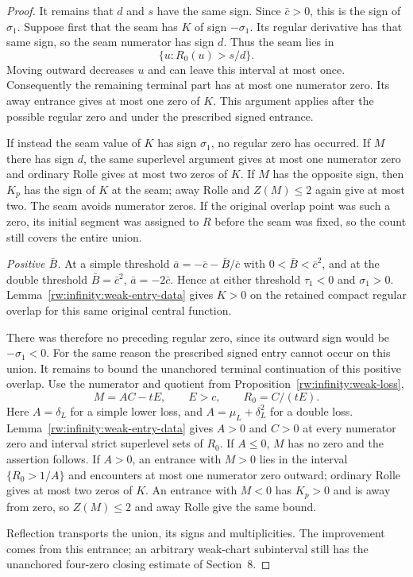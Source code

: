 \begin{proof}
It remains that $d$ and $s$ have the same sign. Since $\bar c>0$,
this is the sign of $\sigma_1$. Suppose first that the seam has
$K$ of sign $-\sigma_1$. Its regular derivative has that same sign,
so the seam numerator has sign $d$. Thus the seam lies in
\[
             \{u:R_0(u)>s/d\}.
\]
Moving outward decreases $u$ and can leave this interval at most once.
Consequently the remaining terminal part has at most one numerator
zero. Its away entrance gives at most one zero of $K$. This argument
applies after the possible regular zero and under the prescribed
signed entrance.

If instead the seam value of $K$ has sign $\sigma_1$, no regular
zero has occurred. If $M$ there has sign $d$, the same superlevel
argument gives at most one numerator zero and ordinary Rolle gives
at most two zeros of $K$. If $M$ has the opposite sign, then $K_p$
has the sign of $K$ at the seam; away Rolle and $Z(M)\le2$ again
give at most two. The seam avoids numerator zeros. If the original
overlap point was such a zero, its initial segment was assigned to $R$
before the seam was fixed, so the count still covers the entire union.

\textit{Positive $\bar B$.}
At a simple threshold $\bar a=-\bar c-\bar B/\bar c$ with
$0<\bar B<\bar c^2$, and at the double threshold
$\bar B=\bar c^2$, $\bar a=-2\bar c$. Hence at either threshold
$\tau_1<0$ and $\sigma_1>0$. Lemma~\ref{rw:infinity:weak-entry-data}
gives $K>0$ on the retained compact regular overlap for this same
original central function.

There was therefore no preceding regular zero, since its outward
sign would be $-\sigma_1<0$. For the same reason the prescribed
signed entry cannot occur on this union. It remains to bound the
unanchored terminal continuation of this positive overlap.
Use the numerator and quotient from
Proposition~\ref{rw:infinity:weak-loss},
\[
 M=AC-tE,\qquad E>c,\qquad R_0=C/(tE).
\]
Here $A=\delta_L$ for a simple lower loss, and
$A=\mu_L+\delta_L^2$ for a double loss.
Lemma~\ref{rw:infinity:weak-entry-data} gives $A>0$ and $C>0$
at every numerator zero and interval strict superlevel sets of $R_0$.
If $A\le0$, $M$ has no
zero and the assertion follows. If $A>0$, an entrance with $M>0$
lies in the interval $\{R_0>1/A\}$ and encounters at most one
numerator zero outward; ordinary Rolle gives at most two zeros of $K$.
An entrance with $M<0$ has $K_p>0$ and is away from zero, so
$Z(M)\le2$ and away Rolle give the same bound.

Reflection transports the union, its signs and multiplicities.
The improvement comes from this entrance; an arbitrary weak-chart
subinterval still has the unanchored four-zero closing estimate of
Section~8.
\end{proof}
